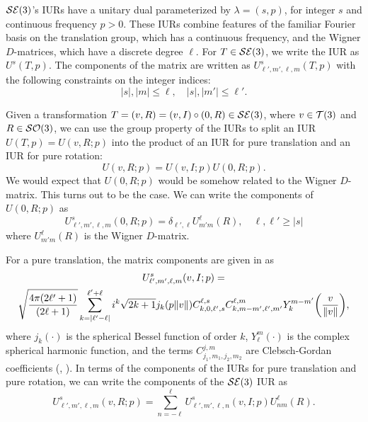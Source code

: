 \documentclass[../../main.tex]{subfiles}
\begin{document}
\begin{refsection}
	$\mathcal{SE} (3)$'s IURs have a unitary dual parameterized by $\lambda = (s, p)$, for integer $s$ and continuous frequency $p > 0$.
	These IURs combine features of the familiar Fourier basis on the translation group, which has a continuous frequency, and the Wigner $D$-matrices, which have a discrete degree $\ell$.
	For $T \in \mathcal{SE} (3)$, we write the IUR as $U^s(T, p)$.
	The components of the matrix are written as $U^s_{\ell', m', \ell, m}(T, p)$ with the following constraints on the integer indices:
	$$|s|,|m| \le \ell, \quad |s|,|m'| \le \ell'.$$

	Given a transformation $T = (v, R) = (v, I) \circ (0, R) \in \mathcal{SE} (3)$, where $v \in \mathcal{T} (3)$ and $R \in \mathcal{SO} (3)$, we can use the group property of the IURs to split an IUR $U(T, p) = U(v, R; p)$ into the product of an IUR for pure translation and an IUR for pure rotation:
	\begin{equation}
		U(v, R; p) = U(v, I; p) U(0, R; p).
	\end{equation}
	We would expect that $U(0, R; p)$ would be somehow related to the Wigner $D$-matrix.
	This turns out to be the case.
	We can write the components of $U(0, R; p)$ as
	\begin{equation}\label{iur-se3-purerot}
		U^s_{\ell',m',\ell,m}(0, R; p) = \delta_{\ell',\ell} U^\ell_{m'm}(R), \quad \ell,\ell' \ge |s|
	\end{equation}
	where $U^\ell_{m'm}(R)$ is the Wigner $D$-matrix.

	For a pure translation, the matrix components are given in \cite[Equation 12.99]{chirikjianStochasticModelsInformation2012} as
	\begin{multline} \label{iur-se3-puretrans}
		U^s_{\ell',m',\ell,m}(v, I; p) =\\
		\sqrt{\frac{4\pi (2\ell'+1)}{(2\ell+1)}} \sum_{k=|\ell' - \ell|}^{\ell' + \ell}
		i^k \sqrt{2k+1} j_k (p \norm{v}) C^{\ell,s}_{k,0,\ell',s}
		C^{\ell,m}_{k,m-m',\ell',m'} Y^{m-m'}_k \qty( \frac{v}{\norm{v}} ),
	\end{multline}
	where $j_k(\cdot)$ is the spherical Bessel function of order $k$, $Y_\ell^m(\cdot)$ is the complex spherical harmonic function, and the terms $C^{j,m}_{j_1,m_1,j_2,m_2}$ are Clebsch-Gordan coefficients (\cite[Equation 12.85]{chirikjianStochasticModelsInformation2012}, \cite[Chapter 8]{varshalovichQuantumTheoryAngular1988}).
	In terms of the components of the IURs for pure translation and pure rotation, we can write the components of the $\mathcal{SE} (3)$ IUR as
	\begin{equation}\label{se3_iur_trans_rot_elem}
		U^s_{\ell',m',\ell,m}(v, R; p) = \sum_{n=-\ell}^\ell U^s_{\ell',m',\ell,n}(v, I; p) U^\ell_{nm}(R).
	\end{equation}


\end{refsection}
\end{document}
